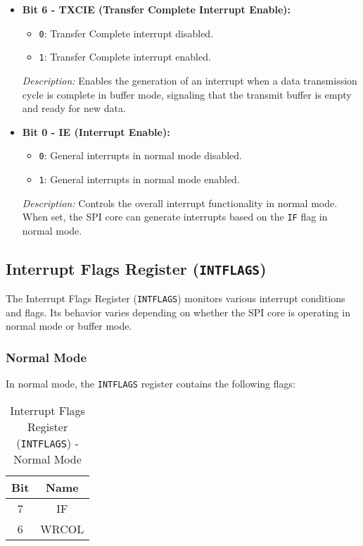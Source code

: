   \begin{itemize}
      
      \item \textbf{Bit 6 - TXCIE (Transfer Complete Interrupt Enable):} 
      \begin{itemize}
          \item \texttt{0}: Transfer Complete interrupt disabled.
          \item \texttt{1}: Transfer Complete interrupt enabled.
      \end{itemize}
      \textit{Description:} Enables the generation of an interrupt when a data transmission cycle is complete in buffer mode, signaling that the transmit buffer is empty and ready for new data.
      
      \item \textbf{Bit 0 - IE (Interrupt Enable):} 
      \begin{itemize}
          \item \texttt{0}: General interrupts in normal mode disabled.
          \item \texttt{1}: General interrupts in normal mode enabled.
      \end{itemize}
      \textit{Description:} Controls the overall interrupt functionality in normal mode. When set, the SPI core can generate interrupts based on the \texttt{IF} flag in normal mode.
  \end{itemize}
  
  \subsection{Interrupt Flags Register (\texttt{INTFLAGS})}
  \label{sec:intflags}
  
  The Interrupt Flags Register (\texttt{INTFLAGS}) monitors various interrupt conditions and flags. Its behavior varies depending on whether the SPI core is operating in normal mode or buffer mode.
  
  \subsubsection{Normal Mode}
  In normal mode, the \texttt{INTFLAGS} register contains the following flags:
  
  \begin{table}[H]
      \centering
      \caption{Interrupt Flags Register (\texttt{INTFLAGS}) - Normal Mode}
      \begin{tabular}{@{}cc@{}}
          \toprule
          \textbf{Bit} & \textbf{Name} \\ \midrule
          7 & IF \\
          6 & WRCOL \\ \bottomrule
      \end{tabular}
      \label{tab:intflags_normal}
  \end{table}
  
